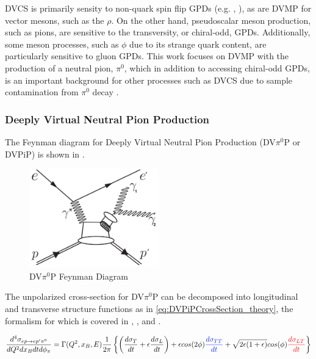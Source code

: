         DVCS is primarily sensity to non-quark spin flip GPDs (e.g. \GPDH, \GPDE), as are DVMP for vector mesons, such as the $\rho$. On the other hand, pseudoscalar meson production, such as pions, are sensitive to the transversity, or chiral-odd, GPDs. Additionally, some meson processes, such as $\phi$ due to its strange quark content, are particularly sensitive to gluon GPDs. This work focuses on DVMP with the production of a neutral pion, $\pi^0$, which in addition to accessing chiral-odd GPDs, is an important background for other processes such as DVCS due to sample contamination from $\pi^0$ decay \parencite{Lee2022MeasurementDetector}.
        
        \subsubsection*{Deeply Virtual Neutral Pion Production}
            The Feynman diagram for Deeply Virtual Neutral Pion Production (DV$\pi^0$P or DVPiP) is shown in . 

            \begin{figure}[H]
                \centering
                \includegraphics[width=0.5\textwidth]{Chapters/Ch1-Intro/Ch1-Sec2-GPDs-DVMP/pics/dvPiP_Feynman_diagram_2.jpg}
                \caption[DVPiP Feynman Diagram]{DV$\pi^0$P Feynman Diagram}
                \label{fig:DVPiP_diagram}
            \end{figure}

            The unpolarized cross-section for DV$\pi^0$P can be decomposed into longitudinal and transverse structure functions as in \eqref{eq:DVPiPCrossSection_theory}, the formalism for which is covered in \parencite{Donnachie1978GeneralizedDominance}, \parencite{Dreschsel1992ThresholdNucleons}, and \parencite{Donnelly2023GeneralResponses}. 
            
 
            \begin{equation}\labelAndRemember{eq:DVPiPCrossSection_theory}
                   {\frac{d^4\sigma_{ep \rightarrow ep'\pi^0}}{dQ^2dx_Bdtd\phi_{\pi}} =
                 \Gamma (Q^2, x_B, E)
                 \frac{1}{2\pi}
                 \left\{ \left(  \textcolor{sigmaT}{\frac{d\sigma_T}{dt}}+\epsilon  \textcolor{sigmaL}{\frac{d\sigma_L}{dt}} \right)+
                 \epsilon cos(2\phi)  \textcolor{sigmaTT}{\frac{d\sigma_{TT}}{dt}} + 
                 \sqrt{2\epsilon(1+\epsilon)} cos(\phi)  \textcolor{sigmaLT}{\frac{d\sigma_{LT}}{dt}} \right\}}
             \end{equation}      

